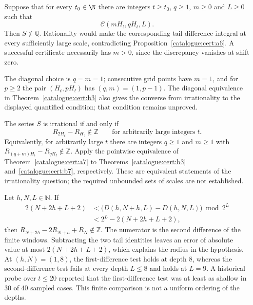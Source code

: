 \begin{thm}\label{catalogue:cert:b7}
Suppose that for every $t_0\in\N$ there are integers
$t\ge t_0$, $q\ge1$, $m\ge0$ and $L\ge0$ such that
\[
 \mathcal C(mH_t,qH_t,L).
\]
Then $S\notin\mathbb Q$. Rationality would make the corresponding
tail difference integral at every sufficiently large scale, contradicting
Proposition~\ref{catalogue:cert:a6}. A successful certificate necessarily
has $m>0$, since the discrepancy vanishes at shift zero.

The diagonal choice is $q=m=1$; consecutive grid points have $m=1$,
and for $p\ge2$ the pair $(H_t,pH_t)$ has $(q,m)=(1,p-1)$. The diagonal equivalence
in Theorem~\ref{catalogue:cert:b3} also gives the converse from
irrationality to the displayed quantified condition; that condition remains unproved.
\end{thm}

\begin{cor}\label{catalogue:cert:b8}
The series $S$ is irrational if and only if
\[
 R_{2H_t}-R_{H_t}\notin\mathbb Z
 \qquad\text{for arbitrarily large integers }t.
\]
Equivalently, for arbitrarily large $t$ there are integers $q\ge1$
and $m\ge1$ with $R_{(q+m)H_t}-R_{qH_t}\notin\mathbb Z$.
Apply the pointwise equivalence of Theorem~\ref{catalogue:cert:a7}
to Theorems~\ref{catalogue:cert:b3} and~\ref{catalogue:cert:b7},
respectively. These are equivalent statements of the irrationality
question; the required unbounded sets of scales are not established.
\end{cor}

\begin{prop}\label{catalogue:cert:b9a}
Let $h,N,L\in\mathbb N$. If
\[
\begin{aligned}
 2(N+2h+L+2)
 &<\bigl(D(h,N+h,L)-D(h,N,L)\bigr)\bmod2^L\\
 &<2^L-2(N+2h+L+2),
\end{aligned}
\]
then $R_{N+2h}-2R_{N+h}+R_N\notin\mathbb Z$.
The numerator is the second difference of the finite windows.
Subtracting the two tail identities leaves an error of absolute value
at most $2(N+2h+L+2)$, which explains the radius in the hypothesis.
At $(h,N)=(1,8)$, the first-difference test holds at depth $8$,
whereas the second-difference test fails at every depth $L\le8$
and holds at $L=9$. A historical probe over $t\le20$ reported that the
first-difference test was at least as shallow in $30$ of $40$ sampled
cases. This finite comparison is not a uniform ordering of the depths.
\end{prop}


